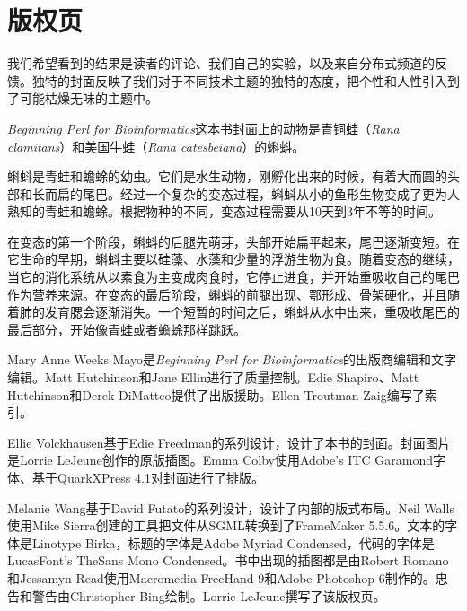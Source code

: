 \chapter*{版权页}
\label{chap:colophon}

我们希望看到的结果是读者的评论、我们自己的实验，以及来自分布式频道的反馈。独特的封面反映了我们对于不同技术主题的独特的态度，把个性和人性引入到了可能枯燥无味的主题中。

\textit{Beginning Perl for Bioinformatics}这本书封面上的动物是青铜蛙（\textit{Rana clamitans}）和美国牛蛙（\textit{Rana catesbeiana}）的蝌蚪。

蝌蚪是青蛙和蟾蜍的幼虫。它们是水生动物，刚孵化出来的时候，有着大而圆的头部和长而扁的尾巴。经过一个复杂的变态过程，蝌蚪从小的鱼形生物变成了更为人熟知的青蛙和蟾蜍。根据物种的不同，变态过程需要从10天到3年不等的时间。

在变态的第一个阶段，蝌蚪的后腿先萌芽，头部开始扁平起来，尾巴逐渐变短。在它生命的早期，蝌蚪主要以硅藻、水藻和少量的浮游生物为食。随着变态的继续，当它的消化系统从以素食为主变成肉食时，它停止进食，并开始重吸收自己的尾巴作为营养来源。在变态的最后阶段，蝌蚪的前腿出现、鄂形成、骨架硬化，并且随着肺的发育腮会逐渐消失。一个短暂的时间之后，蝌蚪从水中出来，重吸收尾巴的最后部分，开始像青蛙或者蟾蜍那样跳跃。

Mary Anne Weeks Mayo是\textit{Beginning Perl for Bioinformatics}的出版商编辑和文字编辑。Matt Hutchinson和Jane Ellin进行了质量控制。Edie Shapiro、Matt Hutchinson和Derek DiMatteo提供了出版援助。Ellen Troutman-Zaig编写了索引。

Ellie Volckhausen基于Edie Freedman的系列设计，设计了本书的封面。封面图片是Lorrie LeJeune创作的原版插图。Emma Colby使用Adobe's ITC Garamond字体、基于Quark\texttrademark XPress 4.1对封面进行了排版。

Melanie Wang基于David Futato的系列设计，设计了内部的版式布局。Neil Walls使用Mike Sierra创建的工具把文件从SGML转换到了FrameMaker 5.5.6。文本的字体是Linotype Birka，标题的字体是Adobe Myriad Condensed，代码的字体是LucasFont's TheSans Mono Condensed。书中出现的插图都是由Robert Romano和Jessamyn Read使用Macromedia FreeHand 9和Adobe Photoshop 6制作的。忠告和警告由Christopher Bing绘制。Lorrie LeJeune撰写了该版权页。
